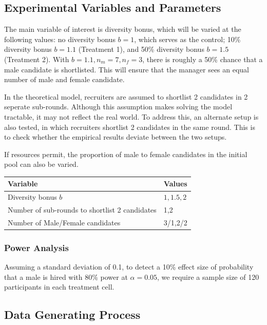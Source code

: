 \documentclass[11pt]{article}
\begin{document}
\subsection{Experimental Variables and Parameters}

The main variable of interest is diversity bonus, which will be varied at the following values: no diversity bonus $b=1$, which serves as the control; 10\% diversity bonus $b=1.1$ (Treatment 1), and 50\% diversity bonus $b=1.5$ (Treatment 2). With $b=1.1, n_m=7, n_f=3$, there is roughly a 50\% chance that a male candidate is shortlisted. This will ensure that the manager sees an equal number of male and female candidate.

In the theoretical model, recruiters are assumed to shortlist 2 candidates in 2 seperate sub-rounds. Although this assumption makes solving the model tractable, it may not reflect the real world. To address this, an alternate setup is also tested, in which recruiters shortlist 2 candidates in the same round. This is to check whether the empirical results deviate between the two setups.

If resources permit, the proportion of male to female candidates in the initial pool can also be varied.

\begin{center}
    \begin{tabular}{ l l}
        \hline
        Variable                                       & Values    \\
        \hline
        Diversity bonus $b$                            & $1,1.5,2$ \\
        Number of sub-rounds to shortlist 2 candidates & 1,2       \\
        Number of Male/Female candidates               & 3/1,2/2
    \end{tabular}
\end{center}


\subsubsection*{Power Analysis}
Assuming a standard deviation of 0.1, to detect a 10\% effect size of probability that a male is hired with 80\% power at $\alpha=0.05$, we require a sample size of 120 participants in each treatment cell.

\subsection{Data Generating Process}
\end{document}
